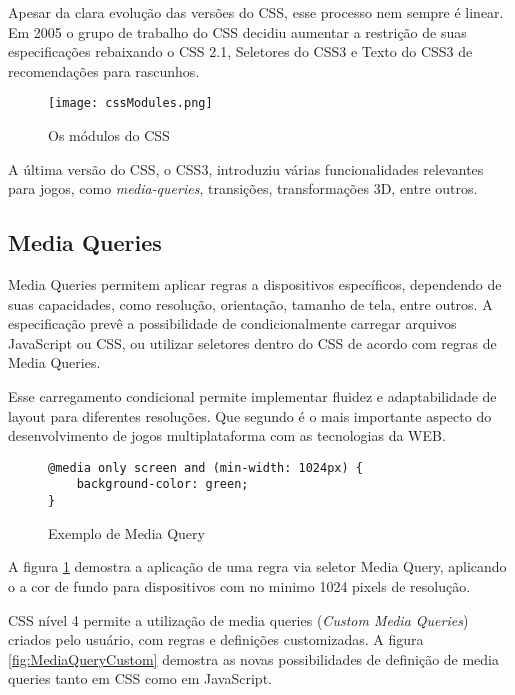 Apesar da clara evolução das versões do CSS, esse processo nem
sempre é linear. Em 2005 o grupo de trabalho do CSS decidiu aumentar a
restrição de suas especificações rebaixando o CSS 2.1, Seletores do
CSS3 e Texto do CSS3 de recomendações para rascunhos.

\begin{figure}[H]
    \centering
    \texttt{[image: cssModules.png]}
    \caption{Os módulos do CSS}
\end{figure}

A última versão do CSS, o CSS3, introduziu várias funcionalidades
relevantes para jogos, como \textit{media-queries}, transições,
transformações 3D, entre outros.

\subsection{Media Queries}

Media Queries permitem aplicar regras a dispositivos específicos,
dependendo de suas capacidades, como resolução, orientação, tamanho
de tela, entre outros. A especificação prevê a possibilidade de
condicionalmente carregar arquivos JavaScript ou CSS, ou utilizar
seletores dentro do CSS de acordo com regras de Media Queries.

Esse carregamento condicional  permite implementar fluidez e
adaptabilidade de layout para diferentes resoluções. Que segundo
\cite{HTML5CrossPlatformGameDevelopment} é o mais importante aspecto do
desenvolvimento de jogos multiplataforma com as tecnologias da WEB.

\begin{figure}[H]
\centering
\begin{verbatim}
@media only screen and (min-width: 1024px) {
    background-color: green;
}
\end{verbatim}
\caption{Exemplo de Media Query}
\label{fig:MediaQuery}
\end{figure}

A figura \ref{fig:MediaQuery} demostra a aplicação de uma regra via
seletor Media Query, aplicando o a cor de fundo para dispositivos com no
minimo 1024 pixels de resolução.

CSS nível 4 permite a utilização de media queries (\textit{Custom
Media Queries}) criados pelo usuário, com regras e definições
customizadas. A figura \ref{fig:MediaQueryCustom} demostra as novas
possibilidades de definição de media queries tanto em CSS como em
JavaScript.

